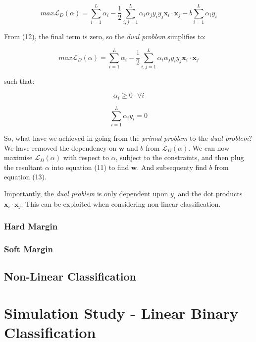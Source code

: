 \documentclass[10pt, a4paper,reqno]{amsart}
\begin{document}
\begin{equation}
max\mathcal{L}_D(\alpha) = \sum_{i=1}^{L}\alpha_i - \frac{1}{2}\sum_{i,j=1}^{L}\alpha_i \alpha_j y_i y_j\mathbf{x}_i\cdot\mathbf{x}_j - b\sum_{i=1}^{L}\alpha_i y_i
\end{equation}

From (12), the final term is zero, so the \emph{dual problem} simplifies to:

\begin{equation}
max\mathcal{L}_D(\alpha) = \sum_{i=1}^{L}\alpha_i - \frac{1}{2}\sum_{i,j=1}^{L}\alpha_i \alpha_j y_i y_j\mathbf{x}_i\cdot\mathbf{x}_j
\end{equation}

such that:

\begin{equation}
\alpha_i\geq0\text{ }\forall{i}
\end{equation}

\begin{equation}
\sum_{i=1}^{L}\alpha_i y_i = 0
\end{equation}

So, what have we achieved in going from the \emph{primal problem} to the \emph{dual problem}? We have removed the dependency on $\mathbf{w}$ and $b$ from $\mathcal{L}_D(\alpha)$. We can now maximise $\mathcal{L}_D(\alpha)$ with respect to $\alpha$, subject to the constraints, and then plug the resultant $\alpha$ into equation (11) to find $\mathbf{w}$. And subsequenty find $b$ from equation (13).

Importantly, the \emph{dual problem} is only dependent upon $y_i$ and the dot products $\mathbf{x}_i\cdot\mathbf{x}_j$. This can be exploited when considering non-linear classification.

\subsubsection{Hard Margin}

\subsubsection{Soft Margin}

\subsection{Non-Linear Classification}


%
%
\clearpage\section{Simulation Study - Linear Binary Classification}
\end{document}
